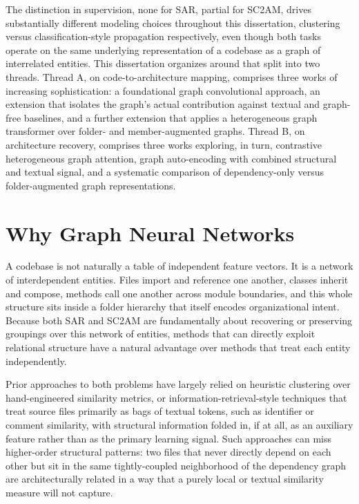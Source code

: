 The distinction in supervision, none for SAR, partial for SC2AM, drives substantially different modeling choices throughout this dissertation, clustering versus classification-style propagation respectively, even though both tasks operate on the same underlying representation of a codebase as a graph of interrelated entities. This dissertation organizes around that split into two threads. Thread A, on code-to-architecture mapping, comprises three works of increasing sophistication: a foundational graph convolutional approach, an extension that isolates the graph's actual contribution against textual and graph-free baselines, and a further extension that applies a heterogeneous graph transformer over folder- and member-augmented graphs. Thread B, on architecture recovery, comprises three works exploring, in turn, contrastive heterogeneous graph attention, graph auto-encoding with combined structural and textual signal, and a systematic comparison of dependency-only versus folder-augmented graph representations.

\section{Why Graph Neural Networks}
\label{sec:why-gnns}

A codebase is not naturally a table of independent feature vectors. It is a network of interdependent entities. Files import and reference one another, classes inherit and compose, methods call one another across module boundaries, and this whole structure sits inside a folder hierarchy that itself encodes organizational intent. Because both SAR and SC2AM are fundamentally about recovering or preserving groupings over this network of entities, methods that can directly exploit relational structure have a natural advantage over methods that treat each entity independently.

Prior approaches to both problems have largely relied on heuristic clustering over hand-engineered similarity metrics, or information-retrieval-style techniques that treat source files primarily as bags of textual tokens, such as identifier or comment similarity, with structural information folded in, if at all, as an auxiliary feature rather than as the primary learning signal. Such approaches can miss higher-order structural patterns: two files that never directly depend on each other but sit in the same tightly-coupled neighborhood of the dependency graph are architecturally related in a way that a purely local or textual similarity measure will not capture.

